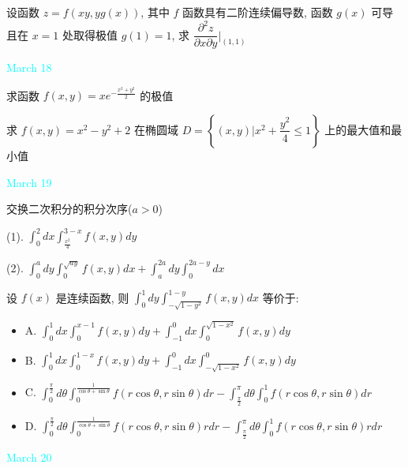 \begin{example}[][Exam: 29.3.6]
	设函数 $z=f(xy,yg(x))$, 其中 $f$ 函数具有二阶连续偏导数, 函数 $g(x)$ 可导且在 $x=1$ 处取得极值 $g(1)=1$, 求 $\dfrac{\partial^{2}z}{\partial x\partial y}|_{(1,1)}$
\end{example}

\textcolor{cyan}{March 18}

\begin{example}[][Exam: 29.3.7]
	求函数 $f(x,y)=xe^{-\frac{x^{2}+y^{2}}{2}}$ 的极值
\end{example}

\begin{example}[][Exam: 29.3.8]
	求 $f(x,y)=x^{2}-y^{2}+2$ 在椭圆域 $D=\left\lbrace (x,y)|x^{2}+\dfrac{y^{2}}{4}\leq 1\right\rbrace$ 上的最大值和最小值
\end{example}

\textcolor{cyan}{March 19}

\begin{example}[][Exam: 29.3.9]
	交换二次积分的积分次序($a>0$)

(1). $\int_{0}^{2}dx\int_{\frac{x^{2}}{4}}^{3-x}f(x,y)dy$

(2). $\int_{0}^{a}dy\int_{0}^{\sqrt{ay}}f(x,y)dx+\int_{a}^{2a}dy\int_{0}^{2a-y}dx$
\end{example}

\begin{example}[][Exam: 29.3.10]
	设 $f(x)$ 是连续函数, 则 $\int_{0}^{1}dy\int_{-\sqrt{1-y^{2}}}^{1-y}f(x,y)dx$ 等价于:
\begin{itemize}
	\item A. $\int_{0}^{1}dx\int_{0}^{x-1}f(x,y)dy+\int_{-1}^{0}dx\int_{0}^{\sqrt{1-x^{2}}}f(x,y)dy$
	\item B. $\int_{0}^{1}dx\int_{0}^{1-x}f(x,y)dy+\int_{-1}^{0}dx\int_{-\sqrt{1-x^{2}}}^{0}f(x,y)dy$
	\item C. $\int_{0}^{\frac{\pi}{2}}d\theta\int_{0}^{\frac{1}{\cos\theta+\sin\theta}}f(r\cos\theta,r\sin\theta)dr-\int_{\frac{\pi}{2}}^{\pi}d\theta\int_{0}^{1}f(r\cos\theta,r\sin\theta)dr$
	\item D. $\int_{0}^{\frac{\pi}{2}}d\theta\int_{0}^{\frac{1}{\cos\theta+\sin\theta}}f(r\cos\theta,r\sin\theta)rdr-\int_{\frac{\pi}{2}}^{\pi}d\theta\int_{0}^{1}f(r\cos\theta,r\sin\theta)rdr$
\end{itemize}
\end{example}

\textcolor{cyan}{March 20}

